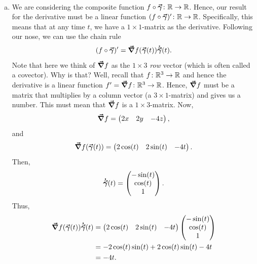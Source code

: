 \documentclass[12pt]{article} %
\begin{document}
\begin{solution}~
    \begin{enumerate}[(a)]
        \item   We are considering the composite function $f\circ \boldsymbol{\vec{\gamma}} \colon \mathbb{R} \to \mathbb{R}$.  Hence, our result for the derivative must be a linear function $(f\circ \boldsymbol{\vec{\gamma}})' \colon \mathbb{R} \to \mathbb{R}$.  Specifically, this means that at any time $t$, we have a $1\times 1$-matrix as the derivative. Following our nose, we can use the chain rule
        \[
        (f\circ \boldsymbol{\vec{\gamma}})' = \boldsymbol{\vec{\nabla}} f(\boldsymbol{\vec{\gamma}}(t))\boldsymbol{\dot{\vec{\gamma}}}(t).
        \]
        Note that here we think of $\boldsymbol{\vec{\nabla}} f$ as the $1\times 3$ \emph{row} vector (which is often called a covector).  Why is that? Well, recall that $f\colon \mathbb{R}^3 \to \mathbb{R}$ and hence the derivative is a linear function $f' = \boldsymbol{\vec{\nabla}} f \colon \mathbb{R}^3 \to \mathbb{R}$.  Hence, $\boldsymbol{\vec{\nabla}} f$ must be a matrix that multiplies by a column vector (a $3\times 1$-matrix) and gives us a number.  This must mean that $\boldsymbol{\vec{\nabla}} f$ is a $1\times 3$-matrix.  Now,
        \[
        \boldsymbol{\vec{\nabla}} f = \begin{pmatrix} 2x & 2y & -4z \end{pmatrix},
        \]
        and
        \[
        \boldsymbol{\vec{\nabla}} f(\boldsymbol{\vec{\gamma}}(t)) = \begin{pmatrix} 2\cos(t) & 2\sin(t) & -4t \end{pmatrix}.
        \]
        Then,
        \[
        \boldsymbol{\dot{\vec{\gamma}}}(t) = \begin{pmatrix} -\sin(t) \\ \cos(t) \\ 1 \end{pmatrix}.
        \]
        Thus,
        \begin{align*}
        \boldsymbol{\vec{\nabla}} f(\boldsymbol{\vec{\gamma}}(t))\boldsymbol{\dot{\vec{\gamma}}}(t) &= \begin{pmatrix} 2\cos(t) & 2\sin(t) & -4t \end{pmatrix}\begin{pmatrix} -\sin(t) \\ \cos(t) \\ 1 \end{pmatrix}\\
        &= -2\cos(t)\sin(t) + 2\cos(t)\sin(t) -4t\\
        &=-4t.
        \end{align*}
        

\end{enumerate}
\end{solution}
\end{document}
